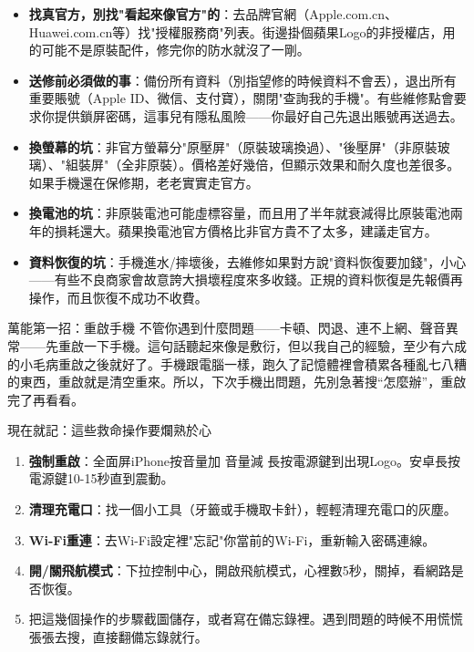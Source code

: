 \begin{itemize}
  \item \textbf{找真官方，別找"看起來像官方"的}：去品牌官網（Apple.com.cn、Huawei.com.cn等）找"授權服務商"列表。街邊掛個蘋果Logo的非授權店，用的可能不是原裝配件，修完你的防水就沒了一剛。
  \item \textbf{送修前必須做的事}：備份所有資料（別指望修的時候資料不會丟），退出所有重要賬號（Apple ID、微信、支付寶），關閉"查詢我的手機"。有些維修點會要求你提供鎖屏密碼，這事兒有隱私風險——你最好自己先退出賬號再送過去。
  \item \textbf{換螢幕的坑}：非官方螢幕分"原壓屏"（原裝玻璃換過）、"後壓屏"（非原裝玻璃）、"組裝屏"（全非原裝）。價格差好幾倍，但顯示效果和耐久度也差很多。如果手機還在保修期，老老實實走官方。
  \item \textbf{換電池的坑}：非原裝電池可能虛標容量，而且用了半年就衰減得比原裝電池兩年的損耗還大。蘋果換電池官方價格比非官方貴不了太多，建議走官方。
  \item \textbf{資料恢復的坑}：手機進水/摔壞後，去維修如果對方說"資料恢復要加錢"，小心——有些不良商家會故意誇大損壞程度來多收錢。正規的資料恢復是先報價再操作，而且恢復不成功不收費。
\end{itemize}

\begin{tcbwarn}{萬能第一招：重啟手機}
不管你遇到什麼問題——卡頓、閃退、連不上網、聲音異常——先重啟一下手機。這句話聽起來像是敷衍，但以我自己的經驗，至少有六成的小毛病重啟之後就好了。手機跟電腦一樣，跑久了記憶體裡會積累各種亂七八糟的東西，重啟就是清空重來。所以，下次手機出問題，先別急著搜“怎麼辦”，重啟完了再看看。

\end{tcbwarn}

\begin{tcbpractice}{現在就記：這些救命操作要爛熟於心}
\begin{enumerate}
  \item \textbf{強制重啟}：全面屏iPhone按音量加 音量減 長按電源鍵到出現Logo。安卓長按電源鍵10-15秒直到震動。
  \item \textbf{清理充電口}：找一個小工具（牙籤或手機取卡針），輕輕清理充電口的灰塵。
  \item \textbf{Wi-Fi重連}：去Wi-Fi設定裡"忘記"你當前的Wi-Fi，重新輸入密碼連線。
  \item \textbf{開/關飛航模式}：下拉控制中心，開啟飛航模式，心裡數5秒，關掉，看網路是否恢復。
  \item 把這幾個操作的步驟截圖儲存，或者寫在備忘錄裡。遇到問題的時候不用慌慌張張去搜，直接翻備忘錄就行。
\end{enumerate}

\end{tcbpractice}
